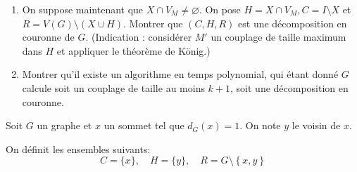 \begin{td-exo}
\begin{enumerate}[start=3]
        \item On suppose maintenant que \(X \cap V_M \neq \varnothing\).
        On pose \(H = X \cap V_M, C = I \setminus X\) et \(R = V(G) \setminus (X \cup H)\).
        Montrer que \((C, H, R)\) est une décomposition en couronne de \(G\).
        (Indication : considérer \(M'\) un couplage de taille maximum dans \(H\) et appliquer le théorème de König.)

        \item Montrer qu'il existe un algorithme en temps polynomial, qui étant donné \(G\) calcule soit un couplage de taille au moins \(k + 1\), soit une décomposition en couronne.
    \end{enumerate}
\end{td-exo}

\begin{td-sol}
    Soit \(G\) un graphe et \(x\) un sommet tel que \(d_G(x) = 1\).
    On note \(y\) le voisin de \(x\).

    On définit les ensembles suivants:
    \begin{equation*}
        C = \{x\}, \quad H = \{y\}, \quad R = G \setminus \left\{x, y\right\}
    \end{equation*}
\end{td-sol}